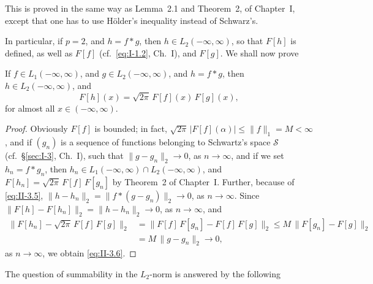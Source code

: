 This is proved in the same way as Lemma~2.1 and Theorem~2, of Chapter~I, except that one has to use H\"older's inequality instead of Schwarz's.

In particular, if $p=2$, and $h=f*g$, then $h\in L_{2}(-\infty,\infty)$, so that $F[h]$ is defined, as well as $F[f]$ (cf.\ \eqref{eq:I-1.2}, Ch.~I), and $F[g]$. We shall now prove

\begin{theorem}\label{thm:II-4}
If $f\in L_{1}(-\infty,\infty)$, and $g\in L_{2}(-\infty,\infty)$, and $h=f*g$, then $h\in L_{2}(-\infty,\infty)$, and
\begin{equation*}\tag{3.6}\label{eq:II-3.6}
F[h](x)=\sqrt{2\pi}\,F[f](x)\,F[g](x),
\end{equation*}
for almost all $x\in(-\infty,\infty)$.
\end{theorem}
\begin{proof}
Obviously $F[f]$ is bounded; in fact, $\sqrt{2\pi}\,|F[f](\alpha)|\le \|f\|_{1}=M<\infty$, and if $(g_{n})$ is a sequence of functions belonging to Schwartz's space $\mathcal S$ (cf.\ \S\ref{sec:I-3}, Ch.~I), such that $\|g-g_{n}\|_{2}\to 0$, as $n\to\infty$, and if we set $h_{n}=f*g_{n}$, then $h_{n}\in L_{1}(-\infty,\infty)\cap L_{2}(-\infty,\infty)$, and $F[h_{n}]=\sqrt{2\pi}\,F[f]\,F[g_{n}]$ by Theorem~2 of Chapter~I. Further, because of \eqref{eq:II-3.5}, $\|h-h_{n}\|_{2}=\|f*(g-g_{n})\|_{2}\to 0$, as $n\to\infty$. Since $\|F[h]-F[h_{n}]\|_{2}=\|h-h_{n}\|_{2}\to 0$, as $n\to\infty$, and
\[
\begin{aligned}
\|F[h_{n}]-\sqrt{2\pi}\,F[f]\,F[g]\|_{2} &= \|F[f]\,F[g_{n}]-F[f]\,F[g]\|_{2}
\le M\,\|F[g_{n}]-F[g]\|_{2}\\
&= M\,\|g-g_{n}\|_{2}\to 0,
\end{aligned}
\]
as $n\to\infty$, we obtain \eqref{eq:II-3.6}.
\end{proof}

The question of summability in the $L_{2}$-norm is answered by the following

